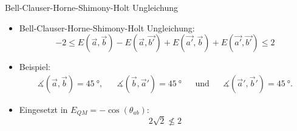 \documentclass{beamer}
\begin{document}
\begin{frame}{Bell-Clauser-Horne-Shimony-Holt Ungleichung}
    \begin{itemize}
        \item Bell-Clauser-Horne-Shimony-Holt Ungleichung:
            \[
                -2 \leq 
                E(\vec{a},\vec{b}) - E(\vec{a},\vec{b'}) + E(\vec{a'},\vec{b}) + E(\vec{a'},\vec{b'})
                \leq 2
            \]
        \item Beispiel:
            \begin{align*}
                \measuredangle(\vec{a},\vec{b}) = \SI{45}{\degree}, && 
                \measuredangle(\vec{b},\vec{a}') = \SI{45}{\degree} && 
                \text{und} &&
                \measuredangle(\vec{a}',\vec{b}') = \SI{45}{\degree}.
            \end{align*}
        \item Eingesetzt in $E_{QM} = -\cos(\theta_{ab})$:
            \[
                2\sqrt{2} \nleq 2
            \]
    \end{itemize}
\end{frame}
\end{document}

